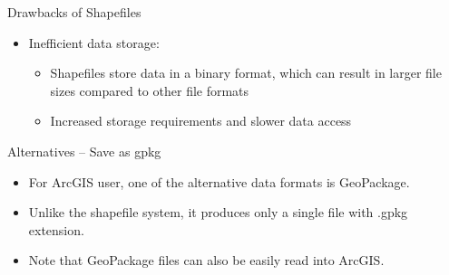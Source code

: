 \documentclass[dvipsnames,hyperref={pdfpagelabels=false}]{beamer}
\begin{document}
\begin{frame}[fragile]{Drawbacks of Shapefiles}
	\begin{itemize}
		
		\item Inefficient data storage:
		\vspace{0.2cm}
		\begin{itemize}
			\item Shapefiles store data in a binary format, which can result in larger file sizes compared to other file formats
			\vspace{0.2cm}
			\item Increased storage requirements and slower data access
		\end{itemize}
		
	\end{itemize}
\end{frame}



\begin{frame}[fragile]{Alternatives -- Save as gpkg}
	\begin{itemize}
		
		\item For ArcGIS user, one of the alternative data formats  is GeoPackage. 
				\vspace{0.2cm}
		\item Unlike the shapefile system, it produces only a single file with .gpkg extension. 
				\vspace{0.2cm}
		\item Note that GeoPackage files can also be easily read into ArcGIS.
		
	
		
	\end{itemize}
\end{frame}
\end{document}
